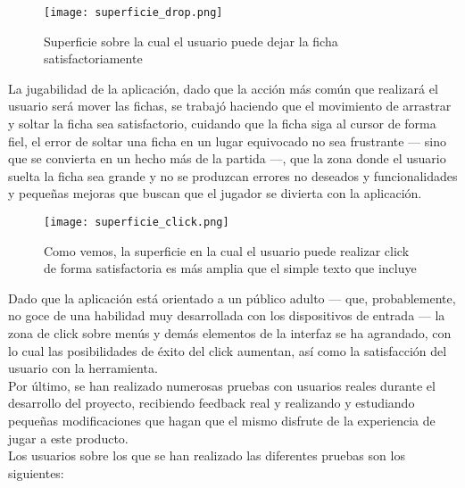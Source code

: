 \begin{figure}[h]
  \label{superficie_drop}
  \begin{center}
    \texttt{[image: superficie\_drop.png]}
  \end{center}
  \caption{Superficie sobre la cual el usuario puede dejar la ficha satisfactoriamente}
\end{figure}


La jugabilidad de la aplicación, dado que la acción más común que realizará el usuario será mover las fichas,
se trabajó haciendo que el movimiento de arrastrar y soltar la ficha sea satisfactorio, cuidando que la ficha siga
al cursor de forma fiel, el error de soltar una ficha en un lugar equivocado no sea frustrante --- sino que se convierta
en un hecho más de la partida ---, que la zona donde el usuario suelta la ficha sea grande y no se produzcan errores
no deseados y funcionalidades y pequeñas mejoras que buscan que el jugador se divierta con la aplicación. \\

\begin{figure}[h]
  \label{superficie_click}
  \begin{center}
    \texttt{[image: superficie\_click.png]}
  \end{center}
  \caption{Como vemos, la superficie en la cual el usuario puede realizar click de forma satisfactoria es más amplia que el simple texto que incluye}
\end{figure}

Dado que la aplicación está orientado a un público adulto --- que, probablemente, no goce de una habilidad muy desarrollada
con los dispositivos de entrada --- la zona de click sobre menús y demás elementos de la interfaz se ha agrandado, con lo
cual las posibilidades de éxito del click aumentan, así como la satisfacción del usuario con la herramienta. \\

Por último, se han realizado numerosas pruebas con usuarios reales durante el desarrollo del proyecto, recibiendo
feedback real y realizando y estudiando pequeñas modificaciones que hagan que el mismo disfrute de la experiencia de
jugar a este producto. \\

Los usuarios sobre los que se han realizado las diferentes pruebas son los siguientes:


